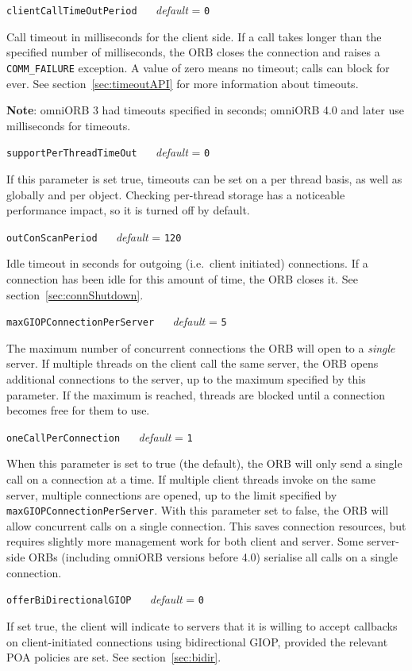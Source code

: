 \documentclass[draft,11pt,twoside,a4paper]{book}
\makeatletter
\newcommand{\code}[1]{\texttt{#1}}
\newcommand{\confopt}[2]
  {\vspace{\baselineskip}\par\noindent\code{#1} ~~ \textit{default} =
   \code{#2}\\[-1ex]\@afterheading}
\newcommand{\dsc}{\discretionary{}{}{}}
\makeatother
\begin{document}
\confopt{clientCallTimeOutPeriod}{0}

Call timeout in milliseconds for the client side. If a call takes
longer than the specified number of milliseconds, the ORB closes the
connection and raises a \code{COMM\_\dsc{}FAILURE} exception. A value
of zero means no timeout; calls can block for ever. See
section~\ref{sec:timeoutAPI} for more information about timeouts.

\vspace{.5\baselineskip}

\noindent\textbf{Note}: omniORB 3 had timeouts specified in seconds;
omniORB 4.0 and later use milliseconds for timeouts.


\confopt{supportPerThreadTimeOut}{0}

If this parameter is set true, timeouts can be set on a per thread
basis, as well as globally and per object. Checking per-thread storage
has a noticeable performance impact, so it is turned off by default.


\confopt{outConScanPeriod}{120}

Idle timeout in seconds for outgoing (i.e.\ client initiated)
connections. If a connection has been idle for this amount of time,
the ORB closes it. See section~\ref{sec:connShutdown}.


\confopt{maxGIOPConnectionPerServer}{5}

The maximum number of concurrent connections the ORB will open to a
\emph{single} server. If multiple threads on the client call the same
server, the ORB opens additional connections to the server, up to the
maximum specified by this parameter. If the maximum is reached,
threads are blocked until a connection becomes free for them to use.


\confopt{oneCallPerConnection}{1}

When this parameter is set to true (the default), the ORB will only
send a single call on a connection at a time. If multiple client
threads invoke on the same server, multiple connections are opened, up
to the limit specified by
\code{maxGIOPConnection\dsc{}PerServer}. With this parameter set to
false, the ORB will allow concurrent calls on a single
connection. This saves connection resources, but requires slightly
more management work for both client and server. Some server-side ORBs
(including omniORB versions before 4.0) serialise all calls on a
single connection.


\confopt{offerBiDirectionalGIOP}{0}

If set true, the client will indicate to servers that it is willing to
accept callbacks on client-initiated connections using bidirectional
GIOP, provided the relevant POA policies are set. See
section~\ref{sec:bidir}.
\end{document}
